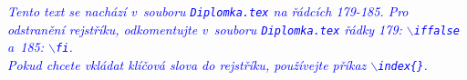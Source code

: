 \documentclass[a4paper,12pt, twoside,notitlepage,openright]{report} %
\def \cestaJedna {01_Intro/}
\def \cestaDva {02_Chapter2/}
\def \cestaTri {03_Chapter3/}
\def \cestaCtyri {04_Chapter4/}
\def \cestaZaver {05_Concl/}
\def \cestaAP {A_Appendices/}
\def \cestaStyles {Styles/}
\begin{document}








\newpage\thispagestyle{empty}



\cleardoublepage
\def\appendixname{Appendix}
\begin{appendix}
\end{appendix}



\cleardoublepage {}
\printindex

\textcolor{blue}{\em Tento text se nachází v~souboru\/ {\rm\texttt{Diplomka.tex} na řádcích 179-185}. Pro odstranění rejstříku, odkomentujte v~souboru {\rm \texttt{Diplomka.tex}} řádky 179\?: $\backslash$\texttt{iffalse} a~185\?: $\backslash$\texttt{fi}.\\[2ex] Pokud chcete vkládat klíčová slova do rejstříku, používejte příkaz $\backslash$\texttt{index\{\}}.}
\end{document}
